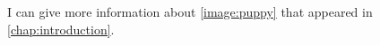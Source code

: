 I can give more information about \autoref{image:puppy} that appeared in \autoref{chap:introduction}.